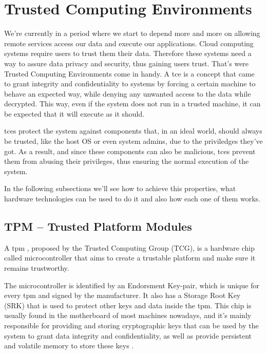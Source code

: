 
\section{Trusted Computing Environments} %
\label{sec:tce}
We're currently in a period where we start to depend more and more on allowing remote services access our data and execute our applications. Cloud computing systems require users to trust them their data. Therefore these systems need a way to assure data privacy and security, thus gaining users trust. That's were Trusted Computing Environments come in handy.
A \gls{tce} is a concept that came to grant integrity and confidentiality to systems by forcing a certain machine to behave an expected way, while denying any unwanted access to the data while decrypted. This way, even if the system does not run in a trusted machine, it can be expected that it will execute as it should. 

\gls{tce}s protect the system against components that, in an ideal world, should always be trusted, like the host OS or even system admins, due to the priviledges they've got. As a result, and since these components can also be malicious, \gls{tce}s prevent them from abusing their privileges, thus ensuring the normal execution of the system. 

In the following subsections we'll see how to achieve this properties, what hardware technologies can be used to do it and also how each one of them works.

\subsection{TPM – Trusted Platform Modules }
\label{ssec:tpm_intro}

A \gls{tpm} \cite{tpmPaper}, proposed by the Trusted Computing Group (TCG), is a hardware chip called microcontroller that aims to create a trustable platform and make sure it remains trustworthy.
 
The microcontroller is identified by an Endorsment Key-pair, which is unique for every \gls{tpm} and signed by the manufacturer. It also has a Storage Root Key (SRK) that is used to protect other keys and data inside the \gls{tpm}. 
This chip is usually found in the motherboard of most machines nowadays, and it's mainly responsible for providing and storing cryptographic keys that can be used by the system to grant data integrity and confidentiality, as well as provide persistent and volatile memory to store these keys \cite{sgxCloudThesis}.

